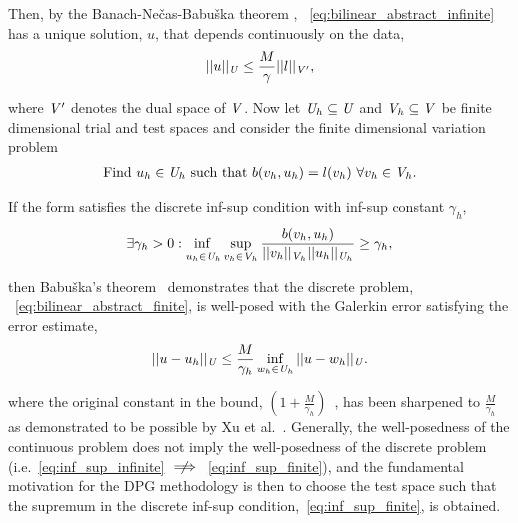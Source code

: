 Then, by the Banach-Ne\v{c}as-Babu\v{s}ka theorem ,
~\eqref{eq:bilinear_abstract_infinite} has a unique solution, $u$, that depends continuously on the data,
\begin{align}
||u||_{\mathit{{{U}}}} \le \frac{M}{\gamma} ||l||_{\mathit{{{V}}}'},
\end{align}

where $\mathit{{{V}}}'$ denotes the dual space of $\mathit{{{V}}}$. Now let $\mathit{{{U}}}_h \subseteq \mathit{{{U}}}$ and $\mathit{{{V}}}_h
\subseteq \mathit{{{V}}}$ be finite dimensional trial and test spaces and consider the finite dimensional variation problem
\begin{align} \label{eq:bilinear_abstract_finite}
\text{Find}\ u_h \in \mathit{{{U}}}_h\ \text{such that}\
b(v_h,u_h) = l(v_h)\ \forall v_h \in \mathit{{{V}}}_h.
\end{align}

If the form satisfies the discrete inf-sup condition with inf-sup constant $\gamma_h$,
\begin{align} \label{eq:inf_sup_finite}
\exists \gamma_h > 0 :
\adjustlimits\inf_{u_h\in\fspace{U}_h} \sup_{v_h\in\fspace{V}_h}
\frac{b(v_h,u_h)}{||v_h||_{\fspace{V}_h}||u_h||_{\fspace{U}_h}} \ge \gamma_h,
\end{align}

then Babu\v{s}ka's theorem~\cite[Theorem ]{Babuska1971} demonstrates that the discrete problem,
~\eqref{eq:bilinear_abstract_finite}, is well-posed with the Galerkin error satisfying the error estimate,
\begin{align} \label{eq:abstract_dpg_error}
||u-u_h||_{\mathit{{{U}}}} \le \frac{M}{\gamma_h} \inf_{w_h \in \mathit{{{U}}}_h} ||u-w_h||_{\mathit{{{U}}}}.
\end{align}

where the original constant in the bound, $\left( 1 + \frac{M}{\gamma_h} \right)$~\cite[eq. ()]{Babuska1971}, has been
sharpened to $\frac{M}{\gamma_h}$ as demonstrated to be possible by Xu et al.~\cite[Theorem \makeblue{2}]{Xu2003}.
Generally, the well-posedness of the continuous problem does not imply the well-posedness of the discrete problem
(i.e.~\eqref{eq:inf_sup_infinite} $\centernot\implies$~\eqref{eq:inf_sup_finite}), and the fundamental motivation for
the DPG methodology is then to choose the test space such that the supremum in the discrete inf-sup
condition,~\eqref{eq:inf_sup_finite}, is obtained. 

